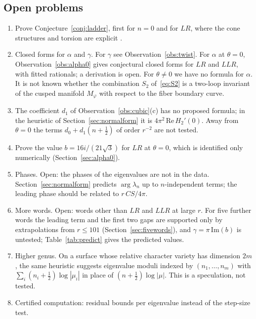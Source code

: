 \documentclass[11pt]{amsart}
\theoremstyle{definition}
\theoremstyle{remark}
\begin{document}
\subsection{Open problems}
\begin{enumerate}
\item Prove Conjecture~\ref{conj:ladder}, first for $n = 0$ and for $LR$, where the
cone structures and torsion are explicit \cite{PW, Porti}.
\item Closed forms for $\alpha$ and $\gamma$. For $\gamma$ see
Observation~\ref{obs:twist}. For $\alpha$ at $\theta = 0$,
Observation~\ref{obs:alpha0} gives conjectural closed forms for $LR$ and $LLR$, with
fitted rationals; a derivation is open. For $\theta \ne 0$ we have no formula for
$\alpha$. It is not known whether the combination $S_2$ of~\eqref{eq:S2} is a
two-loop invariant of the cusped manifold $M_\varphi$ with respect to the fiber
boundary curve.
\item The coefficient $d_1$ of Observation~\ref{obs:cubic}(c) has no proposed formula;
in the heuristic of Section~\ref{sec:normalform} it is
$4\pi^2\,\mathrm{Re}\,H_2'(0)$. Away from $\theta = 0$ the terms $d_0 + d_1(n+\frac12)$
of order $r^{-2}$ are not tested.
\item Prove the value $b = 16i/(21\sqrt3)$ for $LR$ at $\theta = 0$, which is
identified only numerically (Section~\ref{sec:alpha0}).
\item Phases. Open: the phases of the eigenvalues are not in the data.
Section~\ref{sec:normalform} predicts $\arg\lambda_n$ up to $n$-independent terms;
the leading phase should be related to $r\,CS/4\pi$.
\item More words. Open: words other than $LR$ and $LLR$ at large $r$. For five further
words the leading term and the first two gaps are supported only by extrapolations
from $r \le 101$ (Section~\ref{sec:fivewords}), and $\gamma = \pi\,\mathrm{Im}(b)$ is
untested; Table~\ref{tab:predict} gives the predicted values.
\item Higher genus. On a surface whose relative character variety has dimension
$2m$, the same heuristic suggests eigenvalue moduli indexed by $(n_1,\dots,n_m)$ with
$\sum_i (n_i + \frac12)\log|\mu_i|$ in place of $(n+\frac12)\log|\mu|$. This is a
speculation, not tested.
\item Certified computation: residual bounds per eigenvalue instead of the step-size
test.
\end{enumerate}

\appendix
\sloppy
\end{document}
